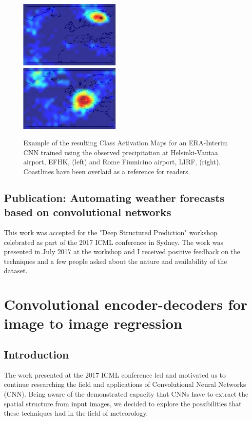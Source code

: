 \begin{figure}[h]
 \centerline{\includegraphics[width=5cm]{paper3_2.png}\\\includegraphics[width=5cm]{paper3_1.png}}\caption{Example of the resulting Class Activation Maps for an ERA-Interim CNN trained using the observed precipitation at Helsinki-Vantaa airport, EFHK, (left) and Rome Fiumicino airport, LIRF, (right). Coastlines have been overlaid as a reference for readers.}\label{paper3}
\end{figure}


\subsection{Publication: Automating weather forecasts based on convolutional networks}

This work was accepted for the "Deep Structured Prediction" workshop celebrated as part of the 2017 ICML conference in Sydney. The work was presented in July 2017 at the workshop and I received positive feedback on the techniques and a few people asked about the nature and availability of the dataset.



\section{Convolutional encoder-decoders for image to image regression}

\subsection{Introduction}
The work presented at the 2017 ICML conference led and motivated us to continue researching the field and applications of Convolutional Neural Networks (CNN). Being aware of the demonstrated capacity that CNNs have to extract the spatial structure from input images, we decided to explore the possibilities that these techniques had in the field of meteorology.

